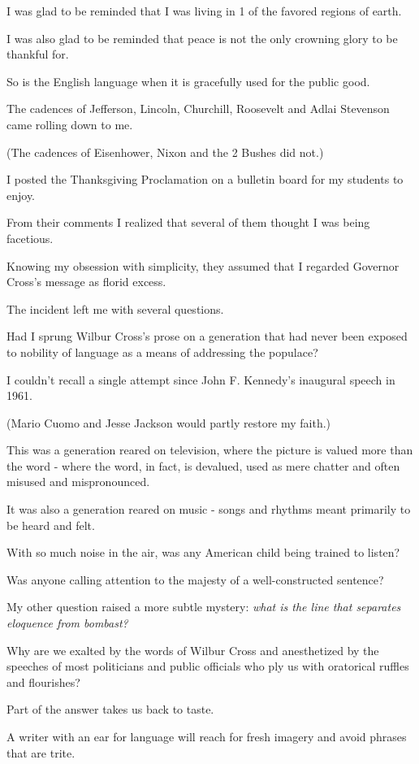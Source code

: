 \documentclass{book}
\numberwithin{equation}{section}
\begin{document}
I was glad to be reminded that I was living in 1 of the favored regions of earth.

I was also glad to be reminded that peace is not the only crowning glory to be thankful for.

So is the English language when it is gracefully used for the public good.

The cadences of Jefferson, Lincoln, Churchill, Roosevelt and Adlai Stevenson came rolling down to me.

(The cadences of Eisenhower, Nixon and the 2 Bushes did not.)

%
I posted the Thanksgiving Proclamation on a bulletin board for my students to enjoy.

From their comments I realized that several of them thought I was being facetious.

Knowing my obsession with simplicity, they assumed that I regarded Governor Cross's message as florid excess.

%
The incident left me with several questions.

Had I sprung Wilbur Cross's prose on a generation that had never been exposed to nobility of language as a means of addressing the populace?

I couldn't recall a single attempt since John F. Kennedy's inaugural speech in 1961.

(Mario Cuomo and Jesse Jackson would partly restore my faith.)

This was a generation reared on television, where the picture is valued more than the word - where the word, in fact, is devalued, used as mere chatter and often misused and mispronounced.

It was also a generation reared on music - songs and rhythms meant primarily to be heard and felt.

With so much noise in the air, was any American child being trained to listen?

Was anyone calling attention to the majesty of a well-constructed sentence?

%
My other question raised a more subtle mystery: \textit{what is the line that separates eloquence from bombast?}

Why are we exalted by the words of Wilbur Cross and anesthetized by the speeches of most politicians and public officials who ply us with oratorical ruffles and flourishes?

%
Part of the answer takes us back to taste.

A writer with an ear for language will reach for fresh imagery and avoid phrases that are trite.
\end{document}
